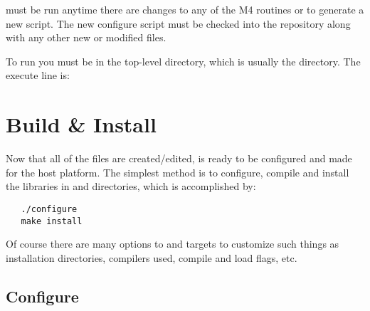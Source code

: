  must be run anytime there are changes to any of the M4 routines
or  to generate a new  script.  The new configure
script must be checked into the \hypre{} repository along with any other new or
modified files.

To run  you must be in the top-level directory, which is usually the
 directory.  The execute line is:  

\section{Build & Install}
\label{Build & Install}


Now that all of the files are created/edited, \hypre{} is ready to be configured
and made for the host platform.  The simplest method is to configure, compile and
install the libraries in  and  directories, which is
accomplished by:
\begin{verbatim}
   ./configure
   make install
\end{verbatim}

Of course there are many options to  and  targets to 
customize such things as installation directories, compilers used, compile and
load flags, etc.  

\subsection{Configure}
\label{Configure}


